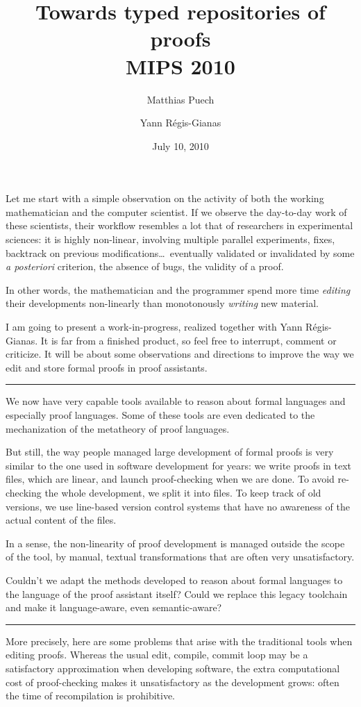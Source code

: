 \documentclass[12pt]{article}
\title{Towards typed repositories of proofs \\[0.6em] 
  \small \textsf{MIPS 2010}}
\date{July 10, 2010}
\author{Matthias Puech \and Yann Régis-Gianas}
\newcommand{\slide}{\vspace{1em} \hrule \vspace{1em}}
\begin{document}
\maketitle

Let me start with a simple observation on the activity of both the
working mathematician and the computer scientist. If we observe the
day-to-day work of these scientists, their workflow resembles a lot
that of researchers in experimental sciences: it is highly non-linear,
involving multiple parallel experiments, fixes, backtrack on previous
modifications\ldots\ eventually validated or invalidated by some
\emph{a posteriori} criterion, the absence of bugs, the validity of a
proof.

In other words, the mathematician and the programmer spend more time
\emph{editing} their developments non-linearly than monotonously
\emph{writing} new material.

I am going to present a work-in-progress, realized together with Yann
Régis-Gianas. It is far from a finished product, so feel free to
interrupt, comment or criticize. It will be about some observations
and directions to improve the way we edit and store formal proofs in
proof assistants.

\slide

We now have very capable tools available to reason about formal
languages and especially proof languages. Some of these tools are even
dedicated to the mechanization of the metatheory of proof languages.

But still, the way people managed large development of formal proofs
is very similar to the one used in software development for years: we
write proofs in text files, which are linear, and launch
proof-checking when we are done. To avoid re-checking the whole
development, we split it into files. To keep track of old versions, we
use line-based version control systems that have no awareness of the
actual content of the files. 

In a sense, the non-linearity of proof development is managed outside
the scope of the tool, by manual, textual transformations that are
often very unsatisfactory.

Couldn't we adapt the methods developed to reason about formal
languages to the language of the proof assistant itself? Could we
replace this legacy toolchain and make it language-aware, even
semantic-aware?

\slide

More precisely, here are some problems that arise with the traditional
tools when editing proofs. Whereas the usual edit, compile, commit
loop may be a satisfactory approximation when developing software, the
extra computational cost of proof-checking makes it unsatisfactory as
the development grows: often the time of recompilation is prohibitive.
\end{document}
